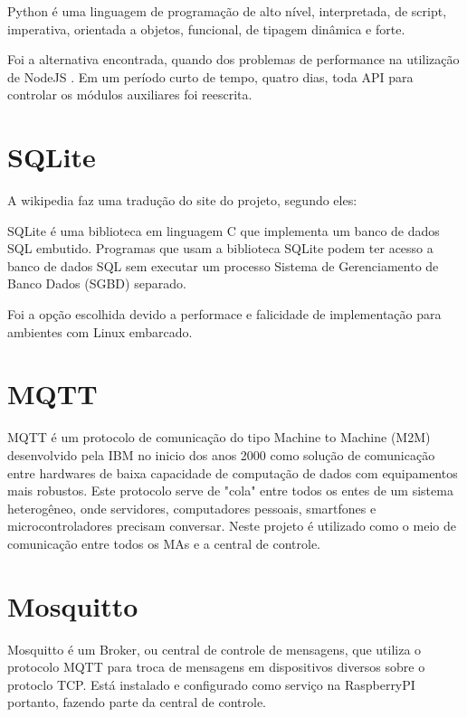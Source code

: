 \begin{citacao}
Python é uma linguagem de programação de alto nível, interpretada, de script, imperativa, orientada a objetos, funcional, de tipagem dinâmica e forte.  \cite{PYTHON}
\end{citacao}

Foi a alternativa encontrada, quando dos problemas de performance na utilização de NodeJS \cite{NodeJS2017}. Em um período curto de tempo, quatro dias, toda API para controlar os módulos auxiliares foi reescrita.

\section{SQLite}
A wikipedia faz uma tradução do site do projeto, segundo eles:

\begin{citacao}
SQLite é uma biblioteca em linguagem C que implementa um banco de dados SQL embutido. Programas que usam a biblioteca SQLite podem ter acesso a banco de dados SQL sem executar um processo Sistema de Gerenciamento de Banco Dados (SGBD) separado. \cite{SQLITE}
\end{citacao}
Foi a opção escolhida devido a performace e falicidade de implementação para ambientes com Linux embarcado.

\section{MQTT}
MQTT é um protocolo de comunicação do tipo Machine to Machine (M2M) desenvolvido pela IBM no inicio dos anos 2000 como solução de comunicação entre hardwares de baixa capacidade de computação de dados com equipamentos mais robustos. Este protocolo serve de "cola" entre todos os entes de um sistema heterogêneo, onde servidores, computadores pessoais, smartfones e microcontroladores precisam conversar. Neste projeto é utilizado como o meio de comunicação entre todos os MAs e a central de controle. \cite{Mqtt2017}

\section{Mosquitto}
Mosquitto é um Broker, ou central de controle de mensagens, que utiliza o protocolo MQTT para troca de mensagens em dispositivos diversos sobre o protoclo TCP. Está instalado e configurado como serviço na RaspberryPI portanto, fazendo parte da central de controle.\cite{MOSQUITTO}

